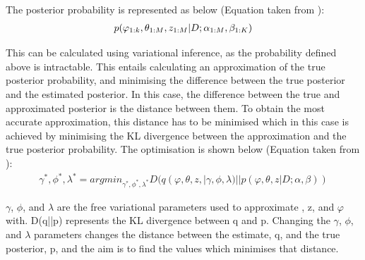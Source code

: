 The posterior probability is represented as below (Equation taken from \cite{ldapost}):
\begin{align*}
	\boldmath{p(\varphi_{1:k}, \theta_{1:M}, z_{1:M} | D; \alpha_{1:M}, \beta_{1:K})}
\end{align*}

This can be calculated using variational inference, as the probability defined above is intractable. This entails calculating an approximation of the true posterior probability, and minimising the difference between the true posterior and the estimated posterior. In this case, the difference between the true and approximated posterior is the distance between them. To obtain the most accurate approximation, this distance has to be minimised which in this case is achieved by minimising the KL divergence between the approximation and the true posterior probability. The optimisation is shown below (Equation taken from \cite{ldapost}):
\begin{align*}
	\gamma^{*}, \phi^{*}, \lambda^{*} = argmin_{\gamma^{*}, \phi^{*}, \lambda^{*}} D(q(\varphi, \theta, z, | \gamma, \phi, \lambda) ||p(\varphi, \theta, z | D; \alpha, \beta))
\end{align*}


$\gamma$, $\phi$, and $\lambda$ are the free variational parameters used to approximate \boldmath{$\theta$}, z, and $\varphi$ with. D(q||p) represents the KL divergence between q and p. Changing the $\gamma$, $\phi$, and $\lambda$ parameters changes the distance between the estimate, q, and the true posterior, p, and the aim is to find the values which minimises that distance.

